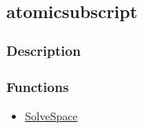 \subsection{atomicsubscript}\label{atomicsubscript}
\subsubsection{Description}


\subsubsection{Functions}
\begin{itemize}
\item \hyperref[SolveSpace]{SolveSpace}
\end{itemize}

